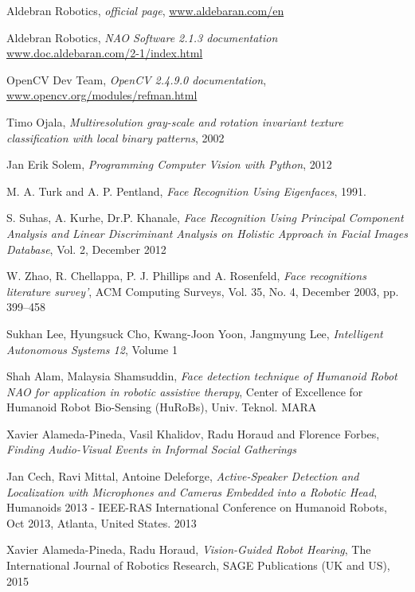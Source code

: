 \begin{thebibliography}{99999}
\singlespace\normalsize

 Aldebran Robotics, \textit{ official page}, \url{www.aldebaran.com/en}

 Aldebran Robotics, \textit{NAO Software 2.1.3 documentation}  \url{www.doc.aldebaran.com/2-1/index.html}

 OpenCV Dev Team, \textit{OpenCV 2.4.9.0 documentation}, \url{www.opencv.org/modules/refman.html}

 Timo Ojala, \textit{Multiresolution gray-scale and rotation invariant texture classification with local binary patterns}, 2002

 Jan Erik Solem, \textit{Programming Computer Vision with Python}, 2012

 M. A. Turk and A. P. Pentland, \textit{Face Recognition Using Eigenfaces}, 1991.

S. Suhas, A. Kurhe, Dr.P. Khanale, \textit{Face Recognition Using Principal Component Analysis and Linear Discriminant Analysis on Holistic Approach in Facial Images Database}, Vol. 2, December 2012

 W. Zhao, R. Chellappa, P. J. Phillips and A. Rosenfeld, \textit{Face recognitions literature survey'}, ACM Computing Surveys, Vol. 35, No. 4, December 2003, pp. 399–458

\bibitem{} Sukhan Lee, Hyungsuck Cho, Kwang-Joon Yoon, Jangmyung Lee, \textit{Intelligent Autonomous Systems 12}, Volume 1

 Shah Alam, Malaysia Shamsuddin, \textit{Face detection technique of Humanoid Robot NAO for application in robotic assistive therapy}, Center of Excellence for Humanoid Robot Bio-Sensing (HuRoBs), Univ. Teknol. MARA

 Xavier Alameda-Pineda, Vasil Khalidov, Radu Horaud and Florence Forbes, \textit{Finding Audio-Visual Events in Informal Social Gatherings}

Jan Cech, Ravi Mittal, Antoine Deleforge, \textit{Active-Speaker Detection and Localization with Microphones and Cameras Embedded into a Robotic Head}, Humanoids 2013 - IEEE-RAS International Conference on Humanoid Robots, Oct 2013, Atlanta, United States. 2013

 Xavier Alameda-Pineda, Radu Horaud, \textit{Vision-Guided Robot Hearing}, The International Journal of Robotics Research, SAGE Publications (UK and US), 2015


\end{thebibliography}
